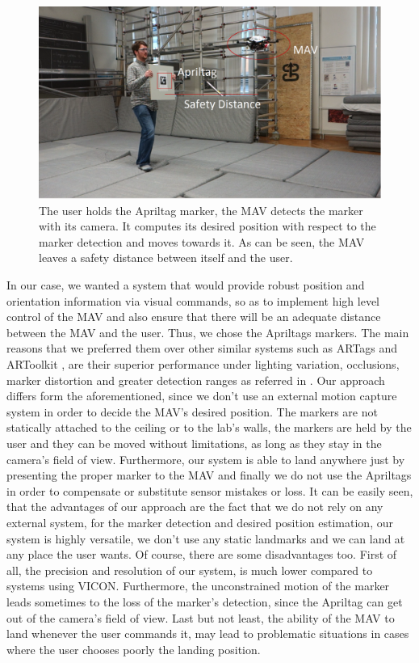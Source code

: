 \begin{figure}
	\centering
	 \includegraphics[width=1.00\textwidth]{images/real_experiment_v1.pdf}
	 \caption{The user holds the Apriltag marker, the MAV detects the marker with its camera. It computes its desired position with respect to the marker detection and moves towards it. As can be seen, the MAV leaves a safety distance between itself and the user.}
	 \label{pics:experimentCapture}
\end{figure}

In our case, we wanted a system that would provide robust position and orientation information via visual commands, so as to implement high level control of the MAV and also ensure that there will be an adequate distance between the MAV and the user. Thus, we chose the Apriltags markers. The main reasons that we preferred them over other similar systems such as ARTags \cite{1467495} and ARToolkit \cite{ARToolkit}, are their superior performance under lighting variation, occlusions, marker distortion and greater detection ranges as referred in \cite{olson2011tags}. Our approach differs form the aforementioned, since we don't use an external motion capture system in order to decide the MAV's desired position. The markers are not statically attached to the ceiling or to the lab's walls, the markers are held by the user and they can be moved without limitations, as long as they stay in the camera's field of view. Furthermore, our system is able to land anywhere just by presenting the proper marker to the MAV and finally we do not use the Apriltags in order to compensate or substitute sensor mistakes or loss. It can be easily seen, that the advantages of our approach are the fact that we do not rely on any external system, for the marker detection and desired position estimation, our system is highly versatile, we don't use any static landmarks and we can land at any place the user wants. Of course, there are some disadvantages too.  First of all, the precision and resolution of our system, is much lower compared to systems using VICON. Furthermore, the unconstrained motion of the marker leads sometimes to the loss of the marker's detection, since the Apriltag can get out of the camera's field of view. Last but not least, the ability of the MAV to land whenever the user commands it, may lead to problematic situations in cases where the user chooses poorly the landing position.


  
  
  
  
  
  
  


